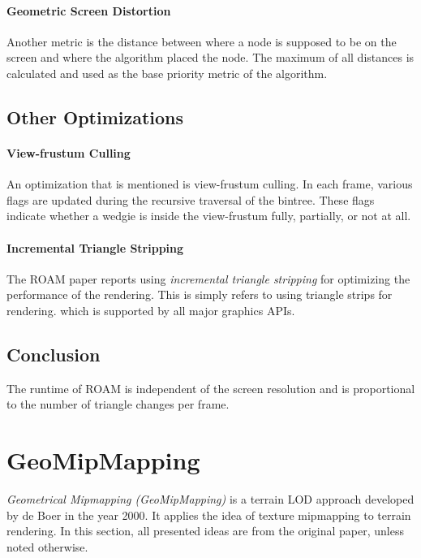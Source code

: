 \paragraph{Geometric Screen Distortion}
Another metric is the distance between where a node is supposed to be on the screen and where the algorithm placed the node.
The maximum of all distances is calculated and used as the base priority metric of the algorithm.

\subsection{Other Optimizations}
\paragraph{View-frustum Culling}
An optimization that is mentioned is view-frustum culling. In each frame, various flags are updated during 
the recursive traversal of the bintree. These flags indicate whether a wedgie is inside the view-frustum 
fully, partially, or not at all.

\paragraph{Incremental Triangle Stripping}
The ROAM paper reports using \textit{incremental triangle stripping} for optimizing the performance of the rendering.
This is simply refers to using triangle strips for rendering. which is supported by all major graphics APIs.

\subsection{Conclusion}
The runtime of ROAM is independent of the screen resolution and is proportional to the 
number of triangle changes per frame. 


\section{GeoMipMapping}
\textit{Geometrical Mipmapping (GeoMipMapping)} is a terrain LOD approach developed by de Boer \cite{geomipmapping} in the year 2000. 
It applies the idea of texture mipmapping to terrain rendering. In this section, all 
presented ideas are from the original paper, unless noted otherwise.

